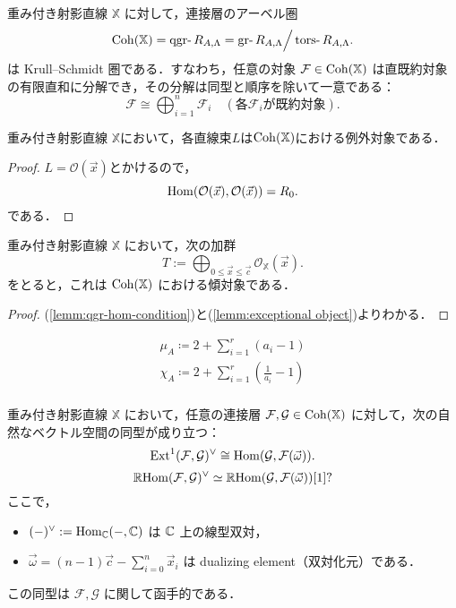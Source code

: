 \begin{thm}\cite{GL87}
重み付き射影直線 $\mathbb{X} $ に対して，連接層のアーベル圏
\[
\Coh(\mathbb{X}) = \qgr R_{A,\Lambda} = \gr R_{A,\Lambda}\Big{/}\tors R_{A,\Lambda}.
\]
は Krull--Schmidt 圏である．すなわち，任意の対象 $\mathcal{F} \in \operatorname{\mathrm{Coh}}(\mathbb{X})$ は直既約対象の有限直和に分解でき，その分解は同型と順序を除いて一意である：
\[
\mathcal{F} \cong \bigoplus_{i=1}^n \mathcal{F}_i \quad (\text{各} \mathcal{F}_i \text{が既約対象}).
\]
\end{thm}

\begin{lemm}\label{lemm:exceptional object}
	重み付き射影直線 $\mathbb{X}$において，各直線束$L$は$\operatorname{\mathrm{Coh}}({\mathbb X})$における例外対象である．
\end{lemm}
\begin{proof}
	$L = \mathcal{O}(\vec{x})$とかけるので，
	\[\operatorname{\mathrm{Hom}}(\mathcal{O}(\vec{x}),\mathcal{O}(\vec{x}))=R_0.\]
	である．
\end{proof}

\begin{thm}\cite{GL87}
重み付き射影直線 $\mathbb{X}$ において，次の加群
\[
T := \bigoplus_{0 \le \vec{x} \le \vec{c}} \mathcal{O}_{\mathbb{X}}(\vec{x}).
\]
をとると，これは $\operatorname{\mathrm{Coh}}(\mathbb{X})$ における傾対象である．
\end{thm}
\begin{proof}
	(\ref{lemm:qgr-hom-condition})と(\ref{lemm:exceptional object})よりわかる．
\end{proof}

\begin{gather*}
	\mu_A \coloneq 2 + \sum_{i=1}^r (a_i - 1)\\
	\chi_A \coloneq 2 + \sum_{i=1}^r \left(\frac{1}{a_i} - 1\right)\\
\end{gather*}

\begin{thm}\cite{GL87}
重み付き射影直線 $\mathbb{X}$ において，任意の連接層 $\mathcal{F}, \mathcal{G} \in \operatorname{\mathrm{Coh}}(\mathbb{X})$ に対して，次の自然なベクトル空間の同型が成り立つ：
\[
\operatorname{\mathrm{Ext}}^1(\mathcal{F}, \mathcal{G})^\vee \cong \operatorname{\mathrm{Hom}}(\mathcal{G}, \mathcal{F}(\vec{\omega})).
\]
\[
\operatorname{\mathbb{R}\mathrm{Hom}}({\mathcal F},{\mathcal G})^\vee \simeq \operatorname{\mathbb{R}\mathrm{Hom}}({\mathcal G},{\mathcal F}(\vec{\omega}))[1]?\]
ここで，
\begin{itemize}
	\item $(-)^\vee := \operatorname{\mathrm{Hom}}_{{\mathbb C}}(-, {\mathbb C})$ は ${\mathbb C}$ 上の線型双対，
  \item $\vec{\omega} = (n - 1)\vec{c} - \sum_{i=0}^n \vec{x}_i$ は dualizing element（双対化元）である．
\end{itemize}
この同型は $\mathcal{F}, \mathcal{G}$ に関して函手的である．
\end{thm}

